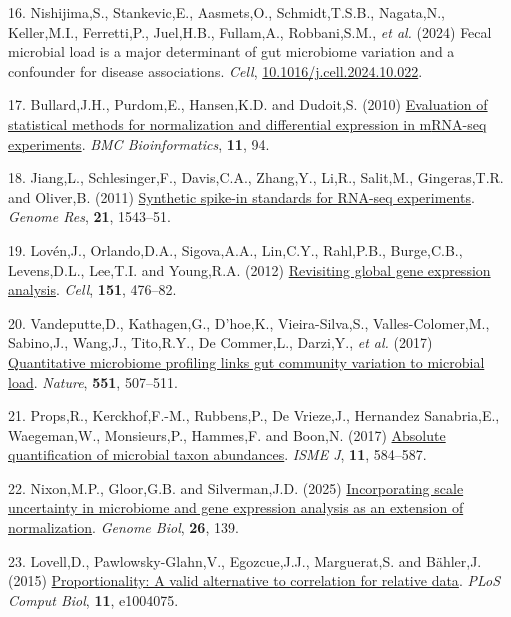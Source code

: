 \documentclass[
]{article}
\newlength{\cslhangindent}
\newenvironment{CSLReferences}[2] %
 {\begin{list}{}{%
  \setlength{\itemindent}{0pt}
  \setlength{\leftmargin}{0pt}
  \setlength{\parsep}{0pt}
  \ifodd #1
   \setlength{\leftmargin}{\cslhangindent}
   \setlength{\itemindent}{-1\cslhangindent}
  \fi
  \setlength{\itemsep}{#2\baselineskip}}}
 {\end{list}}
\begin{document}
\begin{CSLReferences}{1}{1}
16. Nishijima,S., Stankevic,E., Aasmets,O., Schmidt,T.S.B., Nagata,N.,
Keller,M.I., Ferretti,P., Juel,H.B., Fullam,A., Robbani,S.M., \emph{et
al.} (2024) Fecal microbial load is a major determinant of gut
microbiome variation and a confounder for disease associations.
\emph{Cell},
\href{https://doi.org/10.1016/j.cell.2024.10.022}{10.1016/j.cell.2024.10.022}.

17. Bullard,J.H., Purdom,E., Hansen,K.D. and Dudoit,S. (2010)
\href{https://doi.org/10.1186/1471-2105-11-94}{Evaluation of statistical
methods for normalization and differential expression in m{RNA-seq}
experiments}. \emph{BMC Bioinformatics}, \textbf{11}, 94.

18. Jiang,L., Schlesinger,F., Davis,C.A., Zhang,Y., Li,R., Salit,M.,
Gingeras,T.R. and Oliver,B. (2011)
\href{https://doi.org/10.1101/gr.121095.111}{Synthetic spike-in
standards for RNA-seq experiments}. \emph{Genome Res}, \textbf{21},
1543--51.

19. Lovén,J., Orlando,D.A., Sigova,A.A., Lin,C.Y., Rahl,P.B.,
Burge,C.B., Levens,D.L., Lee,T.I. and Young,R.A. (2012)
\href{https://doi.org/10.1016/j.cell.2012.10.012}{Revisiting global gene
expression analysis}. \emph{Cell}, \textbf{151}, 476--82.

20. Vandeputte,D., Kathagen,G., D'hoe,K., Vieira-Silva,S.,
Valles-Colomer,M., Sabino,J., Wang,J., Tito,R.Y., De Commer,L.,
Darzi,Y., \emph{et al.} (2017)
\href{https://doi.org/10.1038/nature24460}{Quantitative microbiome
profiling links gut community variation to microbial load}.
\emph{Nature}, \textbf{551}, 507--511.

21. Props,R., Kerckhof,F.-M., Rubbens,P., De Vrieze,J., Hernandez
Sanabria,E., Waegeman,W., Monsieurs,P., Hammes,F. and Boon,N. (2017)
\href{https://doi.org/10.1038/ismej.2016.117}{Absolute quantification of
microbial taxon abundances}. \emph{ISME J}, \textbf{11}, 584--587.

22. Nixon,M.P., Gloor,G.B. and Silverman,J.D. (2025)
\href{https://doi.org/10.1186/s13059-025-03609-3}{Incorporating scale
uncertainty in microbiome and gene expression analysis as an extension
of normalization}. \emph{Genome Biol}, \textbf{26}, 139.

23. Lovell,D., Pawlowsky-Glahn,V., Egozcue,J.J., Marguerat,S. and
Bähler,J. (2015)
\href{https://doi.org/10.1371/journal.pcbi.1004075}{Proportionality: A
valid alternative to correlation for relative data}. \emph{PLoS Comput
Biol}, \textbf{11}, e1004075.


\end{CSLReferences}
\end{document}
